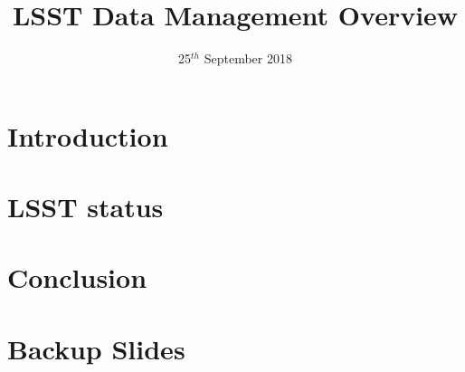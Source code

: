 \documentclass[t,aspectratio=169]{beamer}
\title{LSST Data Management Overview  }
\date{25$^{th}$ September 2018}
\begin{document}
\maketitle
\section{Introduction}

\section{LSST status}



\section{Conclusion}


\appendix
\section{Backup Slides}


\end{document}
